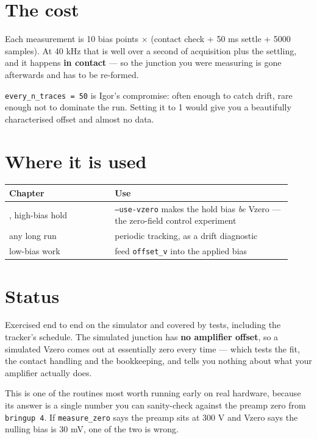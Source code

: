 \section{The cost}

Each measurement is 10 bias points $\times$ (contact check + 50 ms settle + 5000 samples). At 40 kHz that is well over a second of acquisition plus the settling, and it happens \textbf{in contact} --- so the junction you were measuring is gone afterwards and has to be re-formed.

\texttt{every\_\discretionary{}{}{}n\_\discretionary{}{}{}traces = 50} is Igor's compromise: often enough to catch drift, rare enough not to dominate the run. Setting it to 1 would give you a beautifully characterised offset and almost no data.

\section{Where it is used}

\small\setlength{\LTleft}{0pt}\setlength{\LTright}{\fill}
\begin{longtable}{@{}>{\raggedright\arraybackslash}p{0.34\linewidth}>{\raggedright\arraybackslash}p{0.58\linewidth}@{}}
\toprule
\textbf{Chapter} & \textbf{Use} \\
\midrule\endhead
14, high-bias hold & \texttt{--use-vzero} makes the hold bias \emph{be} Vzero --- the zero-field control experiment \\
any long run & periodic tracking, as a drift diagnostic \\
low-bias work & feed \texttt{offset\_\discretionary{}{}{}v} into the applied bias \\
\bottomrule
\end{longtable}
\normalsize

\section{Status}

Exercised end to end on the simulator and covered by tests, including the tracker's schedule. The simulated junction has \textbf{no amplifier offset}, so a simulated Vzero comes out at essentially zero every time --- which tests the fit, the contact handling and the bookkeeping, and tells you nothing about what your amplifier actually does.

This is one of the routines most worth running early on real hardware, because its answer is a single number you can sanity-check against the preamp zero from \texttt{bringup 4}. If \texttt{measure\_\discretionary{}{}{}zero} says the preamp sits at 300 \textmu{}V and Vzero says the nulling bias is 30 mV, one of the two is wrong.

